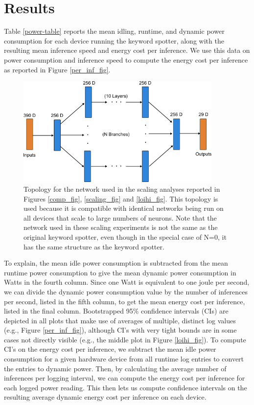 \documentclass{article}
\begin{document}
\section{Results} 
 
Table \ref{power-table} reports the mean idling, runtime, and dynamic power consumption for each device running the keyword spotter, along with the resulting mean inference speed and energy cost per inference. We use this data on power consumption and inference speed to compute the energy cost per inference as reported in Figure \ref{per_inf_fig}.

\begin{figure}[ht!]
\centering
    \includegraphics[width=4in]{./figures/scaled_network.png}
    \caption{Topology for the network used in the scaling analyses reported in Figures \ref{comp_fig}, \ref{scaling_fig} and \ref{loihi_fig}. This topology is used because it is compatible with identical networks being run on all devices that scale to large numbers of neurons. Note that the network used in these scaling experiments is not the same as the original keyword spotter, even though in the special case of N=0, it has the same structure as the keyword spotter.}
\label{scaled_network_fig}
\end{figure}

To explain, the mean idle power consumption is subtracted from the mean runtime power consumption to give the mean dynamic power consumption in Watts in the fourth column. Since one Watt is equivalent to one joule per second, we can divide the dynamic power consumption value by the number of inferences per second, listed in the fifth column, to get the mean energy cost per inference, listed in the final column. Bootstrapped 95\% confidence intervals (CIs) are depicted in all plots that make use of averages of multiple, distinct log values (e.g., Figure \ref{per_inf_fig}), although CI's with very tight bounds are in some cases not directly visible (e.g., the middle plot in Figure \ref{loihi_fig}). To compute CI's on the energy cost per inference, we subtract the mean idle power consumption for a given hardware device from all runtime log entries to convert the entries to dynamic power. Then, by calculating the average number of inferences per logging interval, we can compute the energy cost per inference for each logged power reading. This then lets us compute confidence intervals on the resulting average dynamic energy cost per inference on each device.
\end{document}
